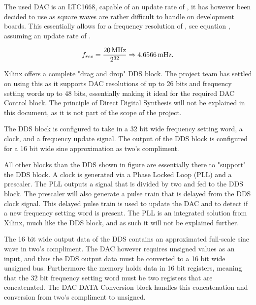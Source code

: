 The used DAC is an LTC1668, capable of an update rate of , it has however been decided to use  as  square waves are rather difficult to handle on development boards. This essentially allows for a frequency resolution of , see equation , assuming an update rate of .

\begin{equation}
    \label{eq:7_2_3_resolution}
    f_{res} = \frac{\SI{20}{\mega\hertz}}{2^{32}} \Rightarrow \SI{4.6566}{\milli\hertz}. 
\end{equation}

Xilinx offers a complete "drag and drop" DDS block. The project team has settled on using this as it supports DAC resolutions of up to 26 bits and frequency setting words up to 48 bits, essentially making it ideal for the required DAC Control block. The principle of Direct Digital Synthesis will not be explained in this document, as it is not part of the scope of the project.

The DDS block is configured to take in a 32 bit wide frequency setting word, a  clock, and a frequency update signal. The output of the DDS block is configured for a 16 bit wide sine approximation as two's compliment.

All other blocks than the DDS shown in figure  are essentially there to "support" the DDS block. A  clock is generated via a Phase Locked Loop (PLL) and a prescaler. The PLL outputs a  signal that is divided by two and fed to the DDS block. The prescaler will also generate a  pulse train that is delayed from the DDS clock signal. This delayed pulse train is used to update the DAC and to detect if a new frequency setting word is present. The PLL is an integrated solution from Xilinx, much like the DDS block, and as such it will not be explained further.

The 16 bit wide output data of the DDS contains an approximated full-scale sine wave in two's compliment. The DAC however requires unsigned values as an input, and thus the DDS output data must be converted to a 16 bit wide unsigned bus. Furthermore the memory holds data in 16 bit registers, meaning that the 32 bit frequency setting word must be two registers that are concatenated. The DAC DATA Conversion block handles this concatenation and conversion from two's compliment to unsigned.

